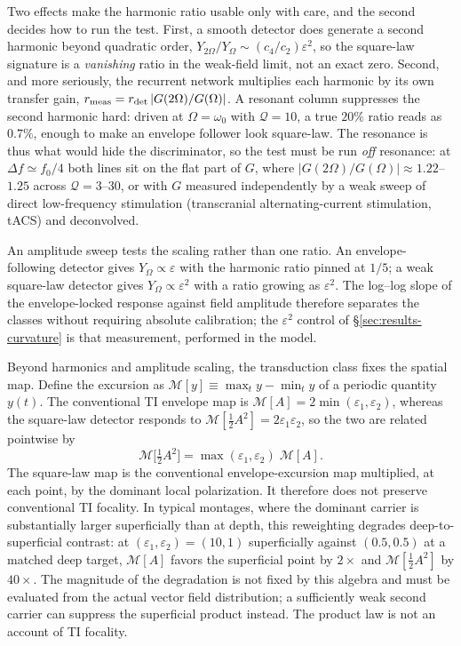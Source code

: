 \documentclass[11pt,a4paper]{article}
\newcommand{\half}{\tfrac{1}{2}}
\begin{document}
Two effects make the harmonic ratio usable only with care, and the second decides how to
run the test. First, a smooth detector does generate a second harmonic beyond quadratic
order, $Y_{2\Omega}/Y_\Omega\sim(c_4/c_2)\varepsilon^2$, so the square-law signature is a
\emph{vanishing} ratio in the weak-field limit, not an exact zero. Second, and more
seriously, the recurrent network multiplies each harmonic by its own transfer gain,
$r_{\rm meas}=r_{\rm det}\,|G(2\Omega)/G(\Omega)|$. A resonant column suppresses the second
harmonic hard: driven at $\Omega=\omega_0$ with $\mathcal{Q}=10$, a true $20\%$ ratio reads
as $0.7\%$, enough to make an envelope follower look square-law. The resonance is thus
what would hide the discriminator, so the test must be run \emph{off} resonance:
at $\Delta f\simeq f_0/4$ both lines sit on the flat part of $G$, where
$|G(2\Omega)/G(\Omega)|\approx1.22$--$1.25$ across $\mathcal{Q}=3$--$30$, or with $G$
measured independently by a weak sweep of direct low-frequency stimulation (transcranial
alternating-current stimulation, tACS) and deconvolved.

An amplitude sweep tests the scaling rather than one ratio. An
envelope-following detector gives $Y_\Omega\propto\varepsilon$ with the harmonic ratio
pinned at $1/5$; a weak square-law detector gives $Y_\Omega\propto\varepsilon^2$ with a
ratio growing as $\varepsilon^2$. The log--log slope of the envelope-locked response
against field amplitude therefore separates the classes without requiring absolute
calibration; the $\varepsilon^2$ control of \S\ref{sec:results-curvature} is that
measurement, performed in the model.

Beyond harmonics and amplitude scaling, the transduction class fixes the spatial map.
Define the excursion as
$\mathcal{M}[y]\equiv\max_t y-\min_t y$ of a periodic quantity $y(t)$. The conventional TI envelope map is
$\mathcal{M}[A]=2\min(\varepsilon_1,\varepsilon_2)$, whereas the square-law detector
responds to $\mathcal{M}[\half A^2]=2\varepsilon_1\varepsilon_2$, so the two are related
pointwise by
\begin{equation}
\mathcal{M}\big[\tfrac12A^2\big]=\max(\varepsilon_1,\varepsilon_2)\;\mathcal{M}[A].
\label{eq:reweight}
\end{equation}
The square-law map is the conventional envelope-excursion map multiplied, at each point,
by the dominant local polarization. It therefore does not preserve conventional TI
focality. In typical montages, where the dominant carrier is substantially larger
superficially than at depth, this reweighting degrades deep-to-superficial contrast: at
$(\varepsilon_1,\varepsilon_2)=(10,1)$ superficially against $(0.5,0.5)$ at a matched
deep target, $\mathcal{M}[A]$ favors the superficial point by $2\times$ and
$\mathcal{M}[\half A^2]$ by $40\times$. The magnitude of the degradation is not fixed by
this algebra and must be evaluated from the actual vector field distribution; a
sufficiently weak second carrier can suppress the superficial product instead. The
product law is not an account of TI focality.
\end{document}
